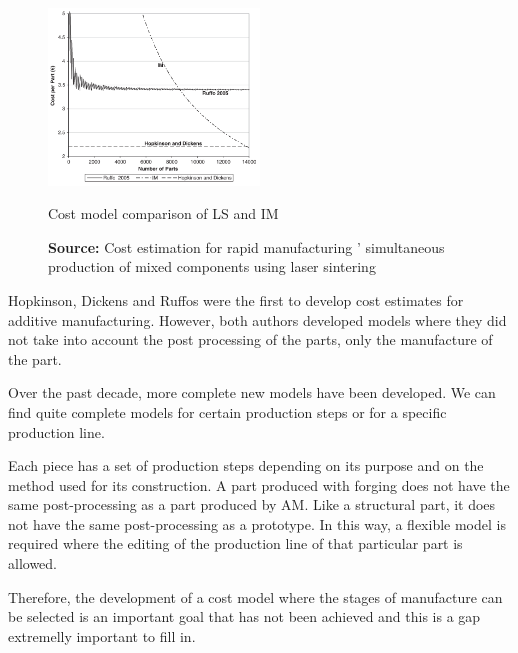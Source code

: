 \begin{figure}[h]
\centering
\includegraphics[width=0.5\textwidth]{./Images/3models.png}
\caption{Cost model comparison of \ac{LS} and \ac{IM}}
\label{Ruffos}
\caption*{\textbf{Source:} Cost estimation for rapid manufacturing ’ simultaneous production of mixed components using laser sintering \cite{ruffo2007cost}}
\end{figure}

Hopkinson, Dickens and Ruffos were the first to develop cost estimates for additive manufacturing. However, both authors developed models where they did not take into account the post processing of the parts, only the manufacture of the part.\par
Over the past decade, more complete new models have been developed. We can find quite complete models for certain production steps or for a specific production line.\par

Each piece has a set of production steps depending on its purpose and on the method used for its construction. A part produced with forging does not have the same post-processing as a part produced by \ac{AM}. Like a structural part, it does not have the same post-processing as a prototype. In this way, a flexible model is required where the editing of the production line of that particular part is allowed.\par
Therefore, the development of a cost model where the stages of manufacture can be selected is an important goal that has not been achieved and this is a gap extremelly important to fill in.

